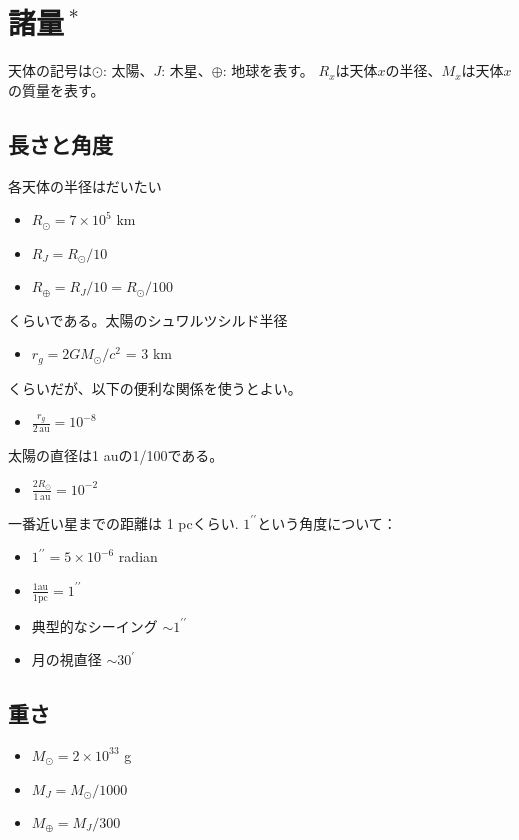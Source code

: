 \section{諸量$\,^\ast$}
天体の記号は$\odot$: 太陽、$J$: 木星、$\oplus$: 地球を表す。
$R_x$は天体$x$の半径、$M_x$は天体$x$の質量を表す。

\subsection*{長さと角度}
各天体の半径はだいたい
\begin{itemize}
    \item $R_\odot = 7 \times 10^5$ km
    \item $R_J = R_\odot/10$
    \item $R_\oplus = R_J/10 = R_\odot/100$
\end{itemize}
くらいである。太陽のシュワルツシルド半径
\begin{itemize}
   \item $r_g = 2 G M_\odot/c^2$ = 3 km
\end{itemize}
くらいだが、以下の便利な関係を使うとよい。
\begin{itemize}
    \item $\displaystyle{\frac{r_g}{2 \, \mathrm{au}}} = 10^{-8}$
\end{itemize}
太陽の直径は1 auの1/100である。
\begin{itemize}
    \item $\displaystyle{\frac{2 R_\odot}{1 \, \mathrm{au}}} = 10^{-2}$
\end{itemize}
一番近い星までの距離は 1 pcくらい. $1^{\prime \prime}$という角度について：
\begin{itemize}
    \item $1^{\prime\prime} = 5 \times 10^{-6}$ radian
    \item $\displaystyle{\frac{1 \mathrm{au}}{1 \mathrm{pc}}} = 1^{\prime\prime}$ \\
    \item 典型的なシーイング $\sim 1^{\prime\prime}$
    \item 月の視直径 $\sim 30^{\prime}$
\end{itemize}

\subsection*{重さ}

\begin{itemize}
    \item $M_\odot = 2 \times 10^{33}$ g
    \item $M_J = M_\odot/1000$
    \item $M_\oplus = M_J/300$
\end{itemize}
